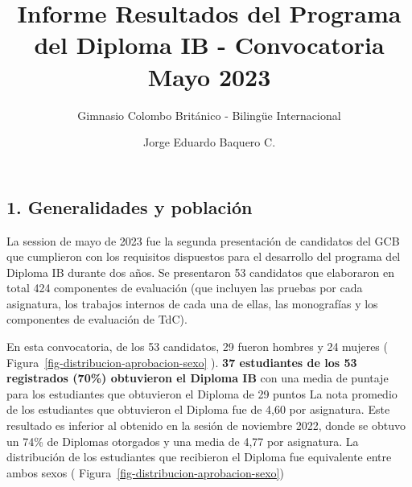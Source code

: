 \documentclass[
  letterpaper,
  DIV=11,
  numbers=noendperiod]{scrartcl}
\title{Informe Resultados del Programa del Diploma IB - Convocatoria
Mayo 2023}
\subtitle{Gimnasio Colombo Británico - Bilingüe Internacional}
\author{Jorge Eduardo Baquero C.}
\date{}
\begin{document}
\maketitle
\ifdefined\Shaded\renewenvironment{Shaded}{\begin{tcolorbox}[boxrule=0pt, borderline west={3pt}{0pt}{shadecolor}, enhanced, interior hidden, frame hidden, breakable, sharp corners]}{\end{tcolorbox}}\fi

\hypertarget{generalidades-y-poblaciuxf3n}{%
\subsection{1. Generalidades y
población}\label{generalidades-y-poblaciuxf3n}}

La session de mayo de 2023 fue la segunda presentación de candidatos del
GCB que cumplieron con los requisitos dispuestos para el desarrollo del
programa del Diploma IB durante dos años. Se presentaron 53 candidatos
que elaboraron en total 424 componentes de evaluación (que incluyen las
pruebas por cada asignatura, los trabajos internos de cada una de ellas,
las monografías y los componentes de evaluación de TdC).

En esta convocatoria, de los 53 candidatos, 29 fueron hombres y 24
mujeres ( Figura~\ref{fig-distribucion-aprobacion-sexo} ). \textbf{37
estudiantes de los 53 registrados (70\%) obtuvieron el Diploma IB} con
una media de puntaje para los estudiantes que obtuvieron el Diploma de
29 puntos La nota promedio de los estudiantes que obtuvieron el Diploma
fue de 4,60 por asignatura. Este resultado es inferior al obtenido en la
sesión de noviembre 2022, donde se obtuvo un 74\% de Diplomas otorgados
y una media de 4,77 por asignatura. La distribución de los estudiantes
que recibieron el Diploma fue equivalente entre ambos sexos (
Figura~\ref{fig-distribucion-aprobacion-sexo})
\end{document}
